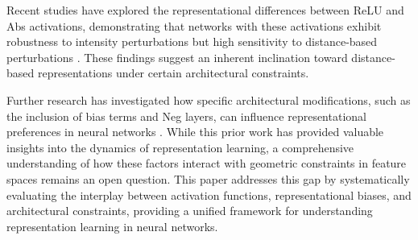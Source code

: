 Recent studies have explored the representational differences between ReLU and Abs activations, demonstrating that networks with these activations exhibit robustness to intensity perturbations but high sensitivity to distance-based perturbations \cite{oursland2024neural, szegedy2013intriguing}. These findings suggest an inherent inclination toward distance-based representations under certain architectural constraints.

Further research has investigated how specific architectural modifications, such as the inclusion of bias terms and Neg layers, can influence representational preferences in neural networks \cite{glorot2011deep}. While this prior work has provided valuable insights into the dynamics of representation learning, a comprehensive understanding of how these factors interact with geometric constraints in feature spaces remains an open question. This paper addresses this gap by systematically evaluating the interplay between activation functions, representational biases, and architectural constraints, providing a unified framework for understanding representation learning in neural networks.
